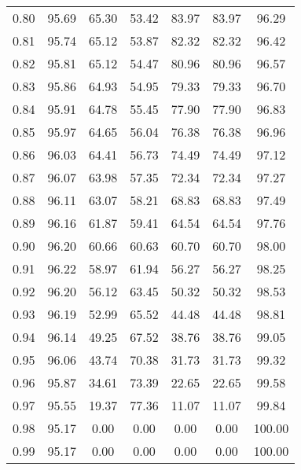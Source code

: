 \begin{tabular}{|c|c|c|c|c|c|c|}
      0.80 &     95.69 &     65.30 &      53.42 &   83.97 &      83.97 &         96.29 \\
      0.81 &     95.74 &     65.12 &      53.87 &   82.32 &      82.32 &         96.42 \\
      0.82 &     95.81 &     65.12 &      54.47 &   80.96 &      80.96 &         96.57 \\
      0.83 &     95.86 &     64.93 &      54.95 &   79.33 &      79.33 &         96.70 \\
      0.84 &     95.91 &     64.78 &      55.45 &   77.90 &      77.90 &         96.83 \\
      0.85 &     95.97 &     64.65 &      56.04 &   76.38 &      76.38 &         96.96 \\
      0.86 &     96.03 &     64.41 &      56.73 &   74.49 &      74.49 &         97.12 \\
      0.87 &     96.07 &     63.98 &      57.35 &   72.34 &      72.34 &         97.27 \\
      0.88 &     96.11 &     63.07 &      58.21 &   68.83 &      68.83 &         97.49 \\
      0.89 &     96.16 &     61.87 &      59.41 &   64.54 &      64.54 &         97.76 \\
      0.90 &     96.20 &     60.66 &      60.63 &   60.70 &      60.70 &         98.00 \\
      0.91 &     96.22 &     58.97 &      61.94 &   56.27 &      56.27 &         98.25 \\
      0.92 &     96.20 &     56.12 &      63.45 &   50.32 &      50.32 &         98.53 \\
      0.93 &     96.19 &     52.99 &      65.52 &   44.48 &      44.48 &         98.81 \\
      0.94 &     96.14 &     49.25 &      67.52 &   38.76 &      38.76 &         99.05 \\
      0.95 &     96.06 &     43.74 &      70.38 &   31.73 &      31.73 &         99.32 \\
      0.96 &     95.87 &     34.61 &      73.39 &   22.65 &      22.65 &         99.58 \\
      0.97 &     95.55 &     19.37 &      77.36 &   11.07 &      11.07 &         99.84 \\
      0.98 &     95.17 &      0.00 &       0.00 &    0.00 &       0.00 &        100.00 \\
      0.99 &     95.17 &      0.00 &       0.00 &    0.00 &       0.00 &        100.00 \\
\bottomrule
\end{tabular}
